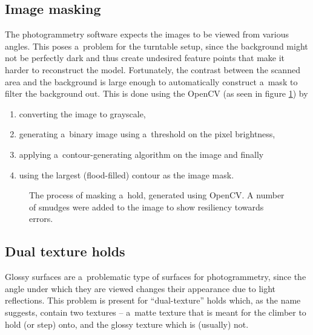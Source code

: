 \subsection{Image masking}
The photogrammetry software expects the images to be viewed from various angles.
This poses a~problem for the turntable setup, since the background might not be perfectly dark and thus create undesired feature points that make it harder to reconstruct the model.
Fortunately, the contrast between the scanned area and the background is large enough to automatically construct a~mask to filter the background out.
This is done using the OpenCV \cite{opencv} (as seen in figure \ref{fig:mask}) by
\begin{enumerate}
	\item converting the image to grayscale,
	\item generating a~binary image using a~threshold on the pixel brightness,
	\item applying a~contour-generating algorithm \cite{suzuki1985topological} on the image and finally
	\item using the largest (flood-filled) contour as the image mask.
\end{enumerate}

\begin{figure}[h]
	\centering
	\hfill
	\hfill
	\hfill
	\hfill
	\caption{The process of masking a~hold, generated using OpenCV. A number of smudges were added to the image to show resiliency towards errors.}%
	\label{fig:mask}
\end{figure}

\subsection{Dual texture holds}\label{sec:dual}
Glossy surfaces are a~problematic type of surfaces for photogrammetry, since the angle under which they are viewed changes their appearance due to light reflections.
This problem is present for ``dual-texture'' holds which, as the name suggests, contain two textures -- a~matte texture that is meant for the climber to hold (or step) onto, and the glossy texture which is (usually) not.

